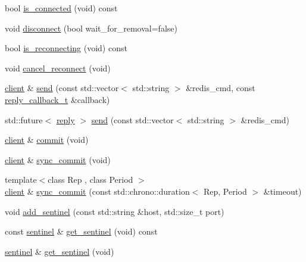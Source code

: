 \begin{DoxyCompactItemize}
\item 
bool \hyperlink{classcpp__redis_1_1client_ad3608dec2c2bfabf2c621ce14f4db37a}{is\+\_\+connected} (void) const
\item 
void \hyperlink{classcpp__redis_1_1client_a292252b61bcfdf9ad3854b54b7fe2740}{disconnect} (bool wait\+\_\+for\+\_\+removal=false)
\item 
bool \hyperlink{classcpp__redis_1_1client_af03ca1aec6416ab35e6aea93c74d89d1}{is\+\_\+reconnecting} (void) const
\item 
void \hyperlink{classcpp__redis_1_1client_adb605a877f65b8f54725576b45aeeca6}{cancel\+\_\+reconnect} (void)
\item 
\hyperlink{classcpp__redis_1_1client}{client} \& \hyperlink{classcpp__redis_1_1client_a490ef812b666e6d845fcacc808b87bc1}{send} (const std\+::vector$<$ std\+::string $>$ \&redis\+\_\+cmd, const \hyperlink{classcpp__redis_1_1client_a061a1140d36d2eaeda82b09a0bb3f9f2}{reply\+\_\+callback\+\_\+t} \&callback)
\item 
std\+::future$<$ \hyperlink{classcpp__redis_1_1reply}{reply} $>$ \hyperlink{classcpp__redis_1_1client_ad6216d6587d50694c16d68e8e182b0be}{send} (const std\+::vector$<$ std\+::string $>$ \&redis\+\_\+cmd)
\item 
\hyperlink{classcpp__redis_1_1client}{client} \& \hyperlink{classcpp__redis_1_1client_a36a48d61a4900e88fd67795ca59cbea3}{commit} (void)
\item 
\hyperlink{classcpp__redis_1_1client}{client} \& \hyperlink{classcpp__redis_1_1client_a23c8a27ee691c52713411ae91e1391fb}{sync\+\_\+commit} (void)
\item 
{\footnotesize template$<$class Rep , class Period $>$ }\\\hyperlink{classcpp__redis_1_1client}{client} \& \hyperlink{classcpp__redis_1_1client_a79a24c8367cb1229fd2c4c38d0f82533}{sync\+\_\+commit} (const std\+::chrono\+::duration$<$ Rep, Period $>$ \&timeout)
\item 
void \hyperlink{classcpp__redis_1_1client_a7050eb52856decad9ab2060a139f4b48}{add\+\_\+sentinel} (const std\+::string \&host, std\+::size\+\_\+t port)
\item 
const \hyperlink{classcpp__redis_1_1sentinel}{sentinel} \& \hyperlink{classcpp__redis_1_1client_a9f94860dad26bca4e860a56ca8aefe36}{get\+\_\+sentinel} (void) const
\item 
\hyperlink{classcpp__redis_1_1sentinel}{sentinel} \& \hyperlink{classcpp__redis_1_1client_a9457cea98f061ce6071f897ba8605813}{get\+\_\+sentinel} (void)
\item 

\end{DoxyCompactItemize}
